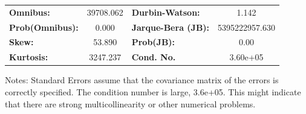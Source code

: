 \begin{center}
\begin{tabular}{lcccccc}
\bottomrule
\end{tabular}
\begin{tabular}{lclc}
\textbf{Omnibus:}       & 39708.062 & \textbf{  Durbin-Watson:     } &       1.142     \\
\textbf{Prob(Omnibus):} &    0.000  & \textbf{  Jarque-Bera (JB):  } & 5395222957.630  \\
\textbf{Skew:}          &   53.890  & \textbf{  Prob(JB):          } &        0.00     \\
\textbf{Kurtosis:}      &  3247.237 & \textbf{  Cond. No.          } &    3.60e+05     \\
\bottomrule
\end{tabular}
\end{center}

Notes: \newline
 [1] Standard Errors assume that the covariance matrix of the errors is correctly specified. \newline
 [2] The condition number is large, 3.6e+05. This might indicate that there are \newline
 strong multicollinearity or other numerical problems.